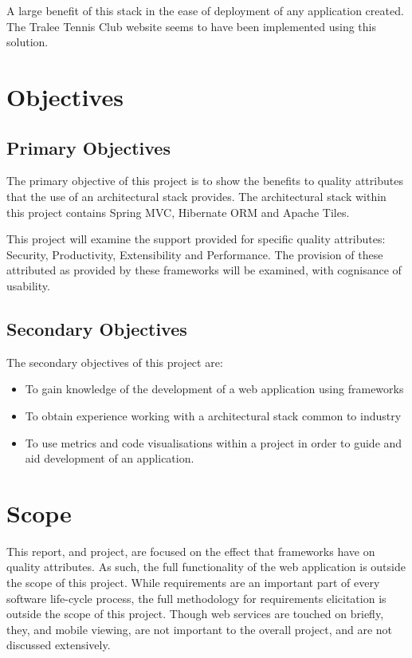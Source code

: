 A large benefit of this stack in the ease of deployment of any application created. The Tralee Tennis Club website seems to have been implemented using this solution.

\section{Objectives}

\subsection{Primary Objectives}

The primary objective of this project is to show the benefits to quality attributes that the use of an architectural stack provides. The architectural stack within this project contains Spring MVC, Hibernate ORM and Apache Tiles. 

This project will examine the support provided for specific quality attributes: Security, Productivity, Extensibility and Performance. The provision of these attributed as provided by these frameworks will be examined, with cognisance of usability. 

\subsection{Secondary Objectives}

The secondary objectives of this project are: 

\begin{itemize}
\item To gain knowledge of the development of a web application using frameworks
\item To obtain experience working with a architectural stack common to industry
\item To use metrics and code visualisations within a project in order to guide and aid development of an application.
\end{itemize}

\section{Scope}

This report, and project, are focused on the effect that frameworks have on quality attributes. As such, the full functionality of the web application is outside the scope of this project. While requirements are an important part of every software life-cycle process, the full methodology for requirements elicitation is outside the scope of this project. Though web services are touched on briefly, they, and mobile viewing, are not important to the overall project, and are not discussed extensively. 

